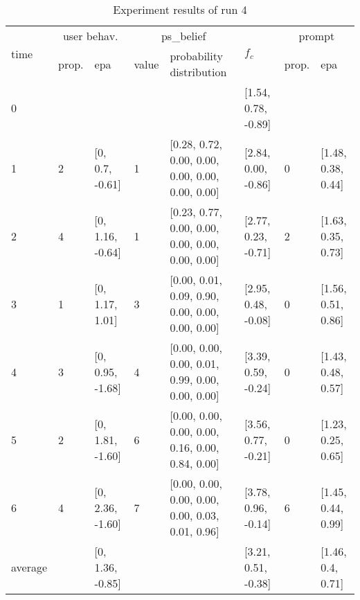 \begin{table}[htbp]\footnotesize
\caption{Experiment results of run 4}
\begin{tabular}{|p{0.4cm}|p{0.6cm}|l|p{0.6cm}|p{3.3cm}|l|p{0.6cm}|l|}
\hline

\multirow{2}{*}{time} & \multicolumn{2}{c|}{user behav.} & \multicolumn{2}{c|}{ps\_belief} &
\multirow{2}{*}{$f_c$} & \multicolumn{2}{c|}{prompt} \\ \cline{2-5}\cline{ 7- 8}
& prop. & epa & value & probability distribution &  & prop. & epa \\ \hline

0 & \multicolumn{1}{l|}{} &  & \multicolumn{1}{l|}{} &  & [1.54, 0.78, -0.89] & \multicolumn{1}{l|}{} &  \\ \hline
1 & 2 & [0, 0.7, -0.61] & 1 & [0.28, 0.72, 0.00, 0.00, 0.00, 0.00, 0.00, 0.00] & [2.84, 0.00, -0.86] & 0 & [1.48, 0.38, 0.44] \\ \hline
2 & 4 & [0, 1.16, -0.64] & 1 & [0.23, 0.77, 0.00, 0.00, 0.00, 0.00, 0.00, 0.00] & [2.77, 0.23, -0.71] & 2 & [1.63, 0.35, 0.73] \\ \hline
3 & 1 & [0, 1.17, 1.01] & 3 & [0.00, 0.01, 0.09, 0.90, 0.00, 0.00, 0.00, 0.00] & [2.95, 0.48, -0.08] & 0 & [1.56, 0.51, 0.86] \\ \hline
4 & 3 & [0, 0.95, -1.68] & 4 & [0.00, 0.00, 0.00, 0.01, 0.99, 0.00, 0.00, 0.00] & [3.39, 0.59, -0.24] & 0 & [1.43, 0.48, 0.57] \\ \hline
5 & 2 & [0, 1.81, -1.60] & 6 & [0.00, 0.00, 0.00, 0.00, 0.16, 0.00, 0.84, 0.00] & [3.56, 0.77, -0.21] & 0 & [1.23, 0.25, 0.65] \\ \hline
6 & 4 & [0, 2.36, -1.60] & 7 & [0.00, 0.00, 0.00, 0.00, 0.00, 0.03, 0.01, 0.96] & [3.78, 0.96, -0.14] & 6 & [1.45, 0.44, 0.99] \\ \hline
\multicolumn{1}{|l|}{average} & \multicolumn{1}{l|}{} & [0, 1.36, -0.85] & \multicolumn{1}{l|}{} &  & [3.21, 0.51, -0.38] & \multicolumn{1}{l|}{} & [1.46, 0.4, 0.71] \\ \hline
\end{tabular}
\label{}
\end{table}



